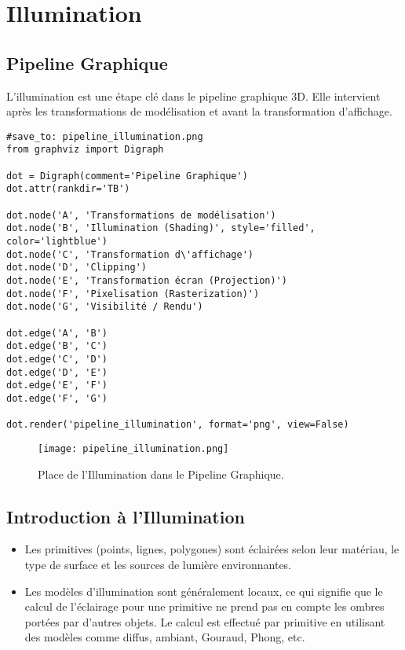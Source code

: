 \documentclass{article}
\begin{document}
\sloppy

\section{Illumination}

\subsection{Pipeline Graphique}

L'illumination est une étape clé dans le pipeline graphique 3D. Elle intervient après les transformations de modélisation et avant la transformation d'affichage.

\begin{verbatim}
#save_to: pipeline_illumination.png
from graphviz import Digraph

dot = Digraph(comment='Pipeline Graphique')
dot.attr(rankdir='TB')

dot.node('A', 'Transformations de modélisation')
dot.node('B', 'Illumination (Shading)', style='filled', color='lightblue')
dot.node('C', 'Transformation d\'affichage')
dot.node('D', 'Clipping')
dot.node('E', 'Transformation écran (Projection)')
dot.node('F', 'Pixelisation (Rasterization)')
dot.node('G', 'Visibilité / Rendu')

dot.edge('A', 'B')
dot.edge('B', 'C')
dot.edge('C', 'D')
dot.edge('D', 'E')
dot.edge('E', 'F')
dot.edge('F', 'G')

dot.render('pipeline_illumination', format='png', view=False)
\end{verbatim}

\begin{figure}[H]
\centering
\texttt{[image: pipeline\_illumination.png]}
\caption{Place de l'Illumination dans le Pipeline Graphique.}
\label{fig:pipeline_illumination}
\end{figure}

\subsection{Introduction à l'Illumination}

\begin{itemize}
    \item Les primitives (points, lignes, polygones) sont éclairées selon leur matériau, le type de surface et les sources de lumière environnantes.
    \item Les modèles d'illumination sont généralement locaux, ce qui signifie que le calcul de l'éclairage pour une primitive ne prend pas en compte les ombres portées par d'autres objets. Le calcul est effectué par primitive en utilisant des modèles comme diffus, ambiant, Gouraud, Phong, etc.
\end{itemize}
\end{document}

